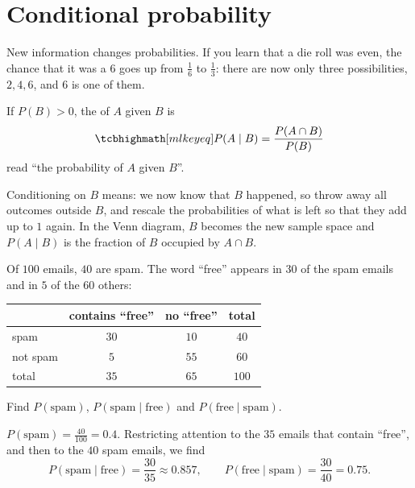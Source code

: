 \section{Conditional probability}\label{sec:conditional}

New information changes probabilities. If you learn that a die roll was even,
the chance that it was a $6$ goes up from $\frac16$ to $\frac13$: there are now
only three possibilities, $2, 4, 6$, and $6$ is one of them.

\begin{definition}\label{def:conditional-probability}
If $P(B) > 0$, the  of $A$ given $B$ is
\[
  \keyeq{P(A \mid B) = \frac{P(A \cap B)}{P(B)}}
\]
read ``the probability of $A$ given $B$''.
\end{definition}

\begin{intuition}
Conditioning on $B$ means: we now know that $B$ happened, so throw away all
outcomes outside $B$, and rescale the probabilities of what is left so that they
add up to $1$ again. In the Venn diagram, $B$ becomes the new sample space and
$P(A \mid B)$ is the fraction of $B$ occupied by $A \cap B$.
\end{intuition}

\begin{example}\label{ex:spam-table}
Of $100$ emails, $40$ are spam. The word ``free'' appears in $30$ of the spam
emails and in $5$ of the $60$ others:
\begin{center}
\begin{tabular}{l|cc|c}
 & contains ``free'' & no ``free'' & total\\
\hline
spam & $30$ & $10$ & $40$\\
not spam & $5$ & $55$ & $60$\\
\hline
total & $35$ & $65$ & $100$
\end{tabular}
\end{center}
Find $P(\text{spam})$, $P(\text{spam} \mid \text{free})$ and
$P(\text{free} \mid \text{spam})$.

\sol $P(\text{spam}) = \frac{40}{100} = 0.4$. Restricting attention to the $35$
emails that contain ``free'', and then to the $40$ spam emails, we find
\[
  P(\text{spam} \mid \text{free}) = \frac{30}{35} \approx 0.857,
  \qquad
  P(\text{free} \mid \text{spam}) = \frac{30}{40} = 0.75 .
\]
\end{example}

